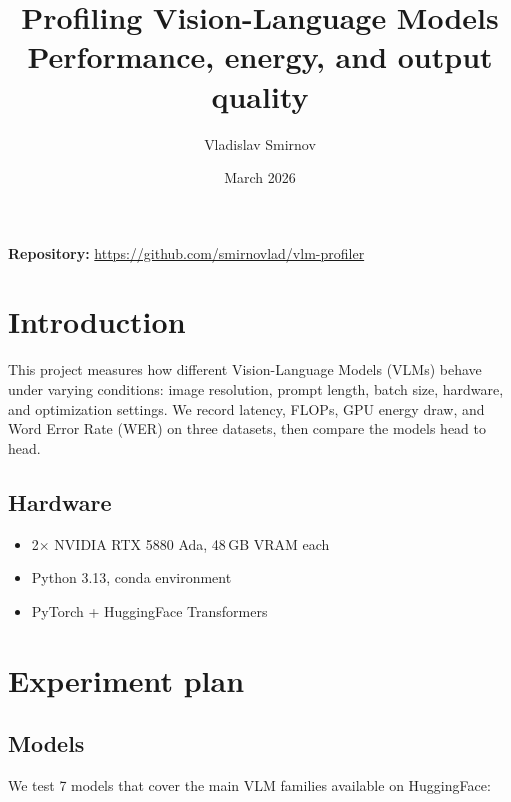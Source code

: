 \documentclass[12pt,a4paper]{article}
\title{
  \vspace{-1cm}
  \textbf{Profiling Vision-Language Models}\\[0.3cm]
  \large Performance, energy, and output quality
}
\author{Vladislav Smirnov}
\date{March 2026}
\begin{document}
\maketitle

\vspace{-0.5cm}
\noindent\textbf{Repository:} \url{https://github.com/smirnovlad/vlm-profiler}

\tableofcontents
\newpage

\section{Introduction}

This project measures how different Vision-Language Models (VLMs) behave under varying conditions: image resolution, prompt length, batch size, hardware, and optimization settings.  We record latency, FLOPs, GPU energy draw, and Word Error Rate (WER) on three datasets, then compare the models head to head.

\subsection{Hardware}
\begin{itemize}[nosep]
  \item 2$\times$ NVIDIA RTX 5880 Ada, 48\,GB VRAM each
  \item Python 3.13, conda environment
  \item PyTorch + HuggingFace Transformers
\end{itemize}

\section{Experiment plan}
\label{sec:plan}

\subsection{Models}

We test 7 models that cover the main VLM families available on HuggingFace:
\end{document}
